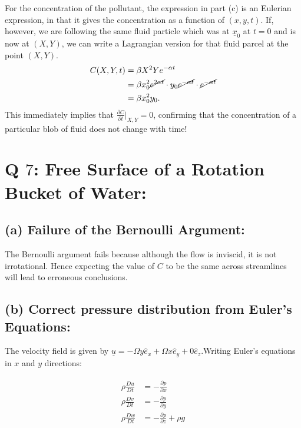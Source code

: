 \documentclass{article}
\begin{document}
For the concentration of the pollutant, the expression in part (c) is an Eulerian expression, in that it gives the concentration as a function of $(x, y, t)$. If, however, we are following the same fluid particle which was at $\underline{x}_{0}$ at $t = 0$ and is now at $(X, Y)$, we can write a Lagrangian version for that fluid parcel at the point $(X, Y)$.
\begin{align}\label{eq:lagrangian_conc}
 \begin{split}
  C(X, Y, t) &= \beta X^{2}Ye^{-\alpha t}\\
  &= \beta x_{0}^{2} \cancel{e^{2\alpha t}}\cdot y_{0} \cancel{e^{-\alpha t}} \cdot \cancel{e^{-\alpha t}}\\
  &= \beta x_{0}^{2}y_{0}.
 \end{split}
\end{align}
This immediately implies that $\frac{\partial C}{\partial t}\big|_{X, Y} = 0$, confirming that the concentration of a particular blob of fluid does not change with time!
\section{Q $7$: Free Surface of a Rotation Bucket of Water:}
\subsection*{(a) Failure of the Bernoulli Argument:}
The Bernoulli argument fails because although the flow is inviscid, it is not irrotational. Hence expecting the value of $C$ to be the same across streamlines will lead to erroneous conclusions. 

\subsection*{(b) Correct pressure distribution from Euler's Equations:}
The velocity field is given by $\underline{u}= -\Omega  y \hat{e}_{x} + \Omega  x \hat{e}_{y} + 0 \hat{e}_{z}$.Writing Euler's equations in $x$ and $y$ directions:

\begin{align}\label{eq:euler_eqns}
 \begin{split}
  \rho \frac{Du}{Dt} &= -\frac{\partial p}{\partial x} \\
  \rho \frac{Dv}{Dt} &= -\frac{\partial p}{\partial y}\\
  \rho \frac{Dw}{Dt} &= -\frac{\partial p}{\partial z} + \rho g
 \end{split}
\end{align}
\end{document}
